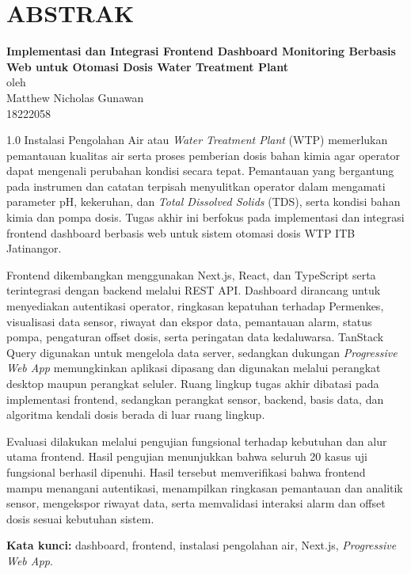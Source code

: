 \chapter*{ABSTRAK}

\begin{center}
    \textbf{Implementasi dan Integrasi Frontend Dashboard Monitoring Berbasis Web untuk Otomasi Dosis Water Treatment Plant} \\
    \vspace{0.4cm}
    oleh \\
    \vspace{0.4cm}
    Matthew Nicholas Gunawan\\
    18222058\\
\end{center}

\begin{spacing}{1.0}
Instalasi Pengolahan Air atau \textit{Water Treatment Plant} (WTP) memerlukan
pemantauan kualitas air serta proses pemberian dosis bahan kimia agar operator dapat mengenali
perubahan kondisi secara tepat. Pemantauan yang bergantung pada instrumen dan
catatan terpisah menyulitkan operator dalam mengamati parameter pH, kekeruhan,
dan \textit{Total Dissolved Solids} (TDS), serta kondisi bahan kimia dan pompa
dosis. Tugas akhir ini berfokus pada implementasi dan integrasi frontend
dashboard berbasis web untuk sistem otomasi dosis WTP ITB Jatinangor.

Frontend dikembangkan menggunakan Next.js, React, dan TypeScript serta
terintegrasi dengan backend melalui REST API. Dashboard dirancang untuk
menyediakan autentikasi operator, ringkasan kepatuhan terhadap Permenkes, visualisasi data sensor,
riwayat dan ekspor data, pemantauan alarm, status pompa, pengaturan offset dosis,
serta peringatan data kedaluwarsa. TanStack Query digunakan untuk mengelola data
server, sedangkan dukungan \textit{Progressive Web App} memungkinkan aplikasi
dipasang dan digunakan melalui perangkat desktop maupun perangkat seluler. Ruang lingkup
tugas akhir dibatasi pada implementasi frontend, sedangkan perangkat sensor, backend, basis data, dan
algoritma kendali dosis berada di luar ruang lingkup.

Evaluasi dilakukan melalui pengujian fungsional terhadap kebutuhan dan alur
utama frontend. Hasil pengujian menunjukkan bahwa seluruh 20 kasus uji fungsional
berhasil dipenuhi. Hasil tersebut memverifikasi bahwa frontend mampu menangani autentikasi, 
menampilkan ringkasan pemantauan dan analitik sensor, mengekspor riwayat data, 
serta memvalidasi interaksi alarm dan offset dosis sesuai kebutuhan sistem.

\noindent\textbf{Kata kunci:} dashboard, frontend, instalasi pengolahan air, Next.js, \textit{Progressive Web App}.
\end{spacing}
